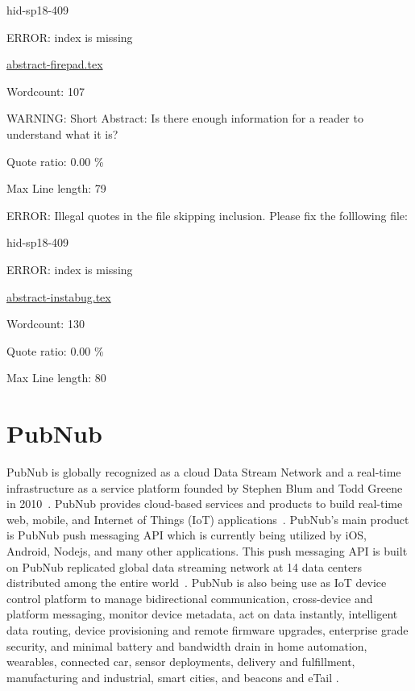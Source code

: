 \begin{IU}

hid-sp18-409

ERROR: index is missing

\href{https://github.com/cloudmesh-community/hid-sp18-409/blob/master//technology/abstract-firepad.tex}{abstract-firepad.tex}

 

Wordcount: 107

WARNING: Short Abstract: Is there enough information for a reader to understand what it is?


Quote ratio: 0.00 \%
 
Max Line length: 79
\end{IU}

ERROR: Illegal quotes in the file skipping inclusion. Please fix the folllowing file:

\begin{IU}

hid-sp18-409

ERROR: index is missing

\href{https://github.com/cloudmesh-community/hid-sp18-409/blob/master//technology/abstract-instabug.tex}{abstract-instabug.tex}

 

Wordcount: 130


Quote ratio: 0.00 \%
 
Max Line length: 80
\end{IU}

\section{PubNub}

PubNub is globally recognized as a cloud Data Stream Network and a real-time
infrastructure as a service platform founded by Stephen Blum and Todd Greene in
2010~\cite{ hid-sp18-409-www-pubnub}. PubNub provides cloud-based services and
products to build real-time web, mobile, and Internet of Things (IoT)
applications~\cite{ hid-sp18-409-www-pubnub-wikipedia}. PubNub's main product is
PubNub push messaging API which is currently being utilized by iOS, Android,
Nodejs, and many other applications.  This push messaging API is built on PubNub
replicated global data streaming network at 14 data centers distributed among
the entire world~\cite{hid-sp18-409-www-pubnub-wikipedia}.  PubNub is also being
use as IoT device control platform to manage bidirectional communication,
cross-device and platform messaging, monitor device metadata, act on data
instantly, intelligent data routing, device provisioning and remote firmware
upgrades, enterprise grade security, and minimal battery and bandwidth drain in
home automation, wearables, connected car, sensor deployments, delivery and
fulfillment, manufacturing and industrial, smart cities, and beacons and eTail
\cite{hid-sp18-409-www-pubnub}.


